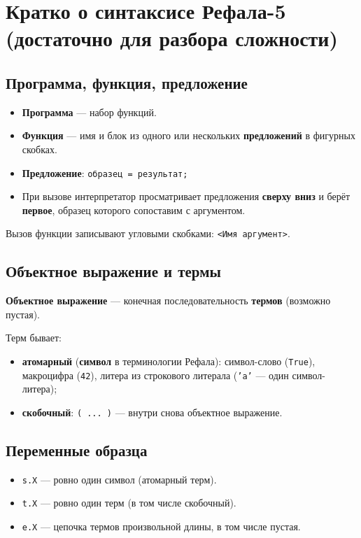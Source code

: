 \documentclass[12pt,a4paper]{article}
\begin{document}
\section{Кратко о синтаксисе Рефала-5 (достаточно для разбора сложности)}

\subsection{Программа, функция, предложение}

\begin{itemize}
  \item \textbf{Программа} --- набор функций.
  \item \textbf{Функция} --- имя и блок из одного или нескольких \textbf{предложений} в фигурных скобках.
  \item \textbf{Предложение}: \texttt{образец = результат;}
  \item При вызове интерпретатор просматривает предложения \textbf{сверху вниз} и берёт \textbf{первое}, образец которого сопоставим с аргументом.
\end{itemize}

Вызов функции записывают угловыми скобками: \texttt{<Имя аргумент>}.

\subsection{Объектное выражение и термы}

\textbf{Объектное выражение} --- конечная последовательность \textbf{термов} (возможно пустая).

Терм бывает:
\begin{itemize}
  \item \textbf{атомарный} (\textbf{символ} в терминологии Рефала): символ-слово (\texttt{True}), макроцифра (\texttt{42}), литера из строкового литерала (\texttt{'a'} --- один символ-литера);
  \item \textbf{скобочный}: \texttt{( ... )} --- внутри снова объектное выражение.
\end{itemize}

\subsection{Переменные образца}

\begin{itemize}
  \item \texttt{s.X} --- ровно один символ (атомарный терм).
  \item \texttt{t.X} --- ровно один терм (в том числе скобочный).
  \item \texttt{e.X} --- цепочка термов произвольной длины, в том числе пустая.
\end{itemize}
\end{document}
